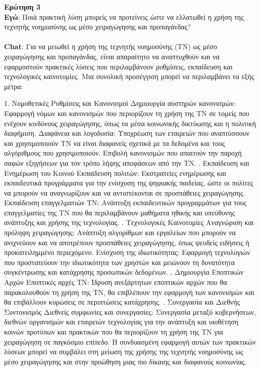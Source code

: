 \documentclass{report}
\begin{document}
\newpage
\textbf{Ερώτηση 3}\\
\textbf{Εγώ}: Ποιά πρακτική λύση μπορείς να προτείνεις ώστε να ελλατωθεί η χρήση της τεχνητής νοημοσύνης ως μέσο χειραγώγησης και προπαγάνδας?\\\\
\textbf{Chat}:
Για να μειωθεί η χρήση της τεχνητής νοημοσύνης (ΤΝ) ως μέσο χειραγώγησης και προπαγάνδας, είναι απαραίτητο να αναπτυχθούν και να εφαρμοστούν πρακτικές λύσεις που περιλαμβάνουν ρυθμίσεις, εκπαίδευση και τεχνολογικές καινοτομίες. Μια συνολική προσέγγιση μπορεί να περιλαμβάνει τα εξής μέτρα:

1. Νομοθετικές Ρυθμίσεις και Κανονισμοί
Δημιουργία αυστηρών κανονισμών: Εφαρμογή νόμων και κανονισμών που περιορίζουν τη χρήση της ΤΝ σε τομείς που ενέχουν κινδύνους χειραγώγησης, όπως τα μέσα κοινωνικής δικτύωσης και η πολιτική διαφήμιση.
Διαφάνεια και λογοδοσία: Υποχρέωση των εταιρειών που αναπτύσσουν και χρησιμοποιούν ΤΝ να είναι διαφανείς σχετικά με τα δεδομένα και τους αλγόριθμους που χρησιμοποιούν. Επιβολή κανονισμών που απαιτούν την παροχή σαφών εξηγήσεων για τον τρόπο λήψης αποφάσεων από την ΤΝ.
. Εκπαίδευση και Ενημέρωση του Κοινού
Εκπαίδευση πολιτών: Εκστρατείες ενημέρωσης και εκπαιδευτικά προγράμματα για την ενίσχυση της ψηφιακής παιδείας, ώστε οι πολίτες να μπορούν να αναγνωρίζουν και να αντιστέκονται σε προσπάθειες χειραγώγησης.
Εκπαίδευση επαγγελματιών ΤΝ: Ανάπτυξη εκπαιδευτικών προγραμμάτων για τους επαγγελματίες της ΤΝ που θα περιλαμβάνουν μαθήματα ηθικής και υπεύθυνης ανάπτυξης και χρήσης της τεχνολογίας.
. Τεχνολογικές Καινοτομίες
Αναγνώριση και πρόληψη χειραγώγησης: Ανάπτυξη αλγορίθμων και εργαλείων που μπορούν να ανιχνεύουν και να αποτρέπουν προσπάθειες χειραγώγησης, όπως ψευδείς ειδήσεις ή προκατειλημμένο περιεχόμενο.
Ενίσχυση της ιδιωτικότητας: Εφαρμογή τεχνολογιών που προστατεύουν την ιδιωτικότητα των χρηστών και μειώνουν τη δυνατότητα συγκέντρωσης και κατάχρησης προσωπικών δεδομένων.
. Δημιουργία Εποπτικών Αρχών
Εποπτικές αρχές ΤΝ: Ίδρυση ανεξάρτητων εποπτικών αρχών που θα παρακολουθούν τη χρήση της ΤΝ, θα επιβλέπουν την εφαρμογή των κανονισμών και θα επιβάλλουν κυρώσεις σε περιπτώσεις κατάχρησης.
. Συνεργασία και Διεθνής Συντονισμός
Διεθνείς συμφωνίες και συνεργασίες: Συνεργασία μεταξύ κυβερνήσεων, διεθνών οργανισμών και εταιρειών τεχνολογίας για την ανάπτυξη και υιοθέτηση κοινών προτύπων και πρακτικών που θα περιορίζουν τη χρήση της ΤΝ για χειραγώγηση σε παγκόσμιο επίπεδο.
\newline
Η συνδυασμένη εφαρμογή αυτών των πρακτικών λύσεων μπορεί να συμβάλει στη μείωση της χρήσης της τεχνητής νοημοσύνης ως μέσο χειραγώγησης και στην προώθηση μιας πιο δίκαιης και διαφανούς κοινωνίας.
\end{document}
